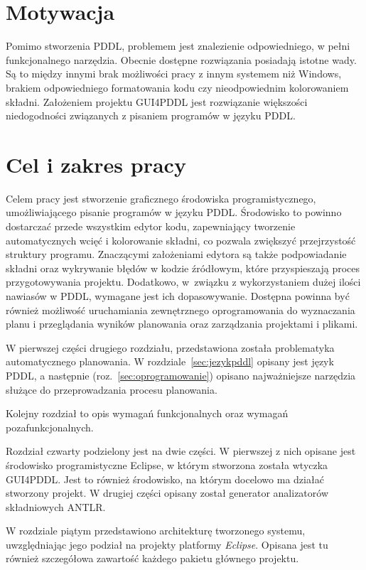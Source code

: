 \section{Motywacja}
Pomimo stworzenia PDDL, problemem jest znalezienie odpowiedniego, w pełni funkcjonalnego narzędzia. Obecnie dostępne rozwiązania posiadają istotne wady. Są to między innymi brak możliwości pracy z innym systemem  niż Windows, brakiem odpowiedniego formatowania kodu czy nieodpowiednim kolorowaniem składni. Założeniem projektu GUI4PDDL jest rozwiązanie większości niedogodności związanych z pisaniem programów w języku PDDL.
\section{Cel i zakres pracy}
Celem pracy jest stworzenie graficznego środowiska programistycznego, umożliwiającego pisanie programów w języku PDDL. Środowisko to powinno dostarczać przede wszystkim edytor kodu, zapewniający tworzenie automatycznych wcięć i kolorowanie składni, co pozwala zwiększyć przejrzystość struktury programu. Znaczącymi założeniami edytora są także podpowiadanie składni oraz wykrywanie błędów w kodzie źródłowym, które przyspieszają proces przygotowywania projektu. Dodatkowo, w~związku z wykorzystaniem dużej ilości nawiasów w PDDL, wymagane jest ich dopasowywanie. Dostępna powinna być również możliwość uruchamiania zewnętrznego oprogramowania do wyznaczania planu i przeglądania wyników planowania oraz zarządzania projektami i plikami.  

W pierwszej części drugiego rozdziału, przedstawiona została problematyka automatycznego planowania. W rozdziale~\ref{sec:jezykpddl} opisany jest język PDDL, a następnie (roz.~\ref{sec:oprogramowanie}) opisano najważniejsze narzędzia służące do przeprowadzania procesu planowania.

Kolejny rozdział to opis wymagań funkcjonalnych oraz wymagań pozafunkcjonalnych.

Rozdział czwarty podzielony jest na dwie części. W pierwszej z nich opisane jest środowisko programistyczne Eclipse, w którym stworzona została wtyczka GUI4PDDL. Jest to również środowisko, na którym docelowo ma działać stworzony projekt. W drugiej części opisany został generator analizatorów składniowych ANTLR.

W rozdziale piątym przedstawiono architekturę tworzonego systemu, uwzględniając jego podział na projekty platformy \emph{Eclipse}. Opisana jest tu również szczegółowa zawartość każdego pakietu głównego projektu.

